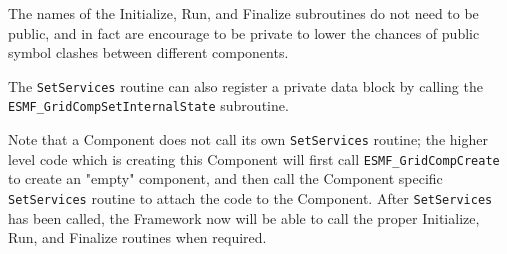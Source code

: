 The names of the Initialize, Run, and Finalize subroutines do not
need to be public, and in fact are encourage to be private to lower
the chances of public symbol clashes between different components.

The {\tt SetServices} routine can also register a private data block
by calling the {\tt ESMF\_GridCompSetInternalState} subroutine.

Note that a Component does not call its own {\tt SetServices} routine;
the higher level code which is creating this Component will first call
{\tt ESMF\_GridCompCreate} to create an "empty" component, and then call
the Component specific {\tt SetServices} routine to attach the code
to the Component.  After {\tt SetServices} has been called, the Framework
now will be able to call the proper Initialize, Run, and Finalize routines
when required.  


